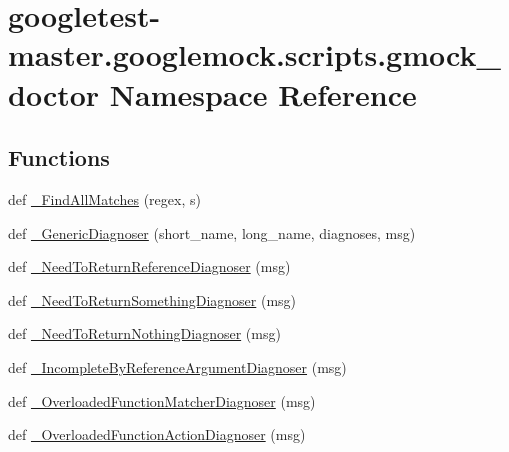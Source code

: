 \hypertarget{namespacegoogletest-master_1_1googlemock_1_1scripts_1_1gmock__doctor}{}\section{googletest-\/master.googlemock.\+scripts.\+gmock\+\_\+doctor Namespace Reference}
\label{namespacegoogletest-master_1_1googlemock_1_1scripts_1_1gmock__doctor}
\subsection*{Functions}
\begin{DoxyCompactItemize}
\item 
def \mbox{\hyperlink{namespacegoogletest-master_1_1googlemock_1_1scripts_1_1gmock__doctor_a4be0f8dac41eaca5bdd44baf5746ca8c}{\+\_\+\+Find\+All\+Matches}} (regex, s)
\item 
def \mbox{\hyperlink{namespacegoogletest-master_1_1googlemock_1_1scripts_1_1gmock__doctor_ade650444c2a865ed9d05b5981f316b24}{\+\_\+\+Generic\+Diagnoser}} (short\+\_\+name, long\+\_\+name, diagnoses, msg)
\item 
def \mbox{\hyperlink{namespacegoogletest-master_1_1googlemock_1_1scripts_1_1gmock__doctor_a03dd29c054744af8138527968286bdf9}{\+\_\+\+Need\+To\+Return\+Reference\+Diagnoser}} (msg)
\item 
def \mbox{\hyperlink{namespacegoogletest-master_1_1googlemock_1_1scripts_1_1gmock__doctor_a3bd7360b2d5d33ec00dcb9547df0f35c}{\+\_\+\+Need\+To\+Return\+Something\+Diagnoser}} (msg)
\item 
def \mbox{\hyperlink{namespacegoogletest-master_1_1googlemock_1_1scripts_1_1gmock__doctor_a75a358e934a8a78cec8c214240c0dd17}{\+\_\+\+Need\+To\+Return\+Nothing\+Diagnoser}} (msg)
\item 
def \mbox{\hyperlink{namespacegoogletest-master_1_1googlemock_1_1scripts_1_1gmock__doctor_a2c4c9e38261c39f3110b9d1510c24dde}{\+\_\+\+Incomplete\+By\+Reference\+Argument\+Diagnoser}} (msg)
\item 
def \mbox{\hyperlink{namespacegoogletest-master_1_1googlemock_1_1scripts_1_1gmock__doctor_a68cad62e5d928a460f2a2e6a2e25710e}{\+\_\+\+Overloaded\+Function\+Matcher\+Diagnoser}} (msg)
\item 
def \mbox{\hyperlink{namespacegoogletest-master_1_1googlemock_1_1scripts_1_1gmock__doctor_a42f7107bb50907e4109a43f114c4678d}{\+\_\+\+Overloaded\+Function\+Action\+Diagnoser}} (msg)

\end{DoxyCompactItemize}
